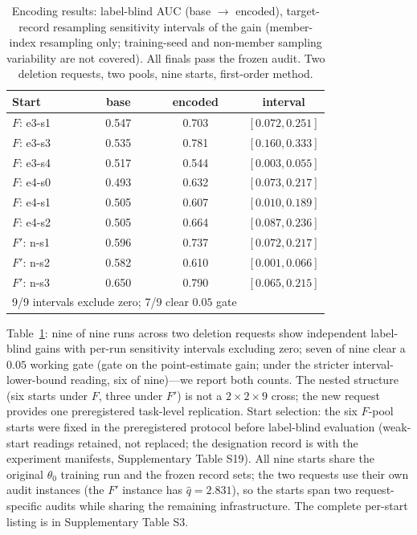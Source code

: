\documentclass[lettersize,journal]{IEEEtran}
\begin{document}
\begin{table}[t]
\caption{Encoding results: label-blind AUC (base $\to$
encoded), target-record resampling sensitivity intervals of
the gain (member-index resampling only; training-seed and
non-member sampling variability are not covered). All finals
pass the frozen audit. Two deletion requests, two pools,
nine starts, first-order method.}
\label{tab:encoding-main}
\centering
\small
\setlength{\tabcolsep}{3pt}
\begin{tabular}{lccc}
\toprule
Start & base & encoded & interval \\
\midrule
$F$: e3-s1 & 0.547 & 0.703 & $[0.072, 0.251]$ \\
$F$: e3-s3 & 0.535 & 0.781 & $[0.160, 0.333]$ \\
$F$: e3-s4 & 0.517 & 0.544 & $[0.003, 0.055]$ \\
$F$: e4-s0 & 0.493 & 0.632 & $[0.073, 0.217]$ \\
$F$: e4-s1 & 0.505 & 0.607 & $[0.010, 0.189]$ \\
$F$: e4-s2 & 0.505 & 0.664 & $[0.087, 0.236]$ \\
$F'$: n-s1 & 0.596 & 0.737 & $[0.072, 0.217]$ \\
$F'$: n-s2 & 0.582 & 0.610 & $[0.001, 0.066]$ \\
$F'$: n-s3 & 0.650 & 0.790 & $[0.065, 0.215]$ \\
\midrule
\multicolumn{3}{l}{9/9 intervals exclude zero; 7/9 clear $0.05$
gate} & \\
\bottomrule
\end{tabular}
\end{table}

Table~\ref{tab:encoding-main}: nine of nine runs across two
deletion requests show independent label-blind gains with
per-run sensitivity intervals excluding zero; seven of nine
clear a $0.05$ working gate (gate on the point-estimate gain;
under the stricter interval-lower-bound reading, six of
nine)---we report both counts. The nested structure (six
starts under $F$, three under $F'$) is not a
$2{\times}2{\times}9$ cross; the new request provides one
preregistered task-level replication. Start selection: the
six $F$-pool starts were fixed in the preregistered protocol
before label-blind evaluation (weak-start readings retained,
not replaced; the designation record is with the experiment
manifests, Supplementary Table S19). All nine starts share
the original $\theta_0$ training run and the frozen record
sets; the two requests use their own audit instances (the
$F'$ instance has $\hat q{=}2.831$), so the starts span two
request-specific audits while sharing the remaining
infrastructure. The complete per-start listing is in
Supplementary Table S3.
\end{document}
